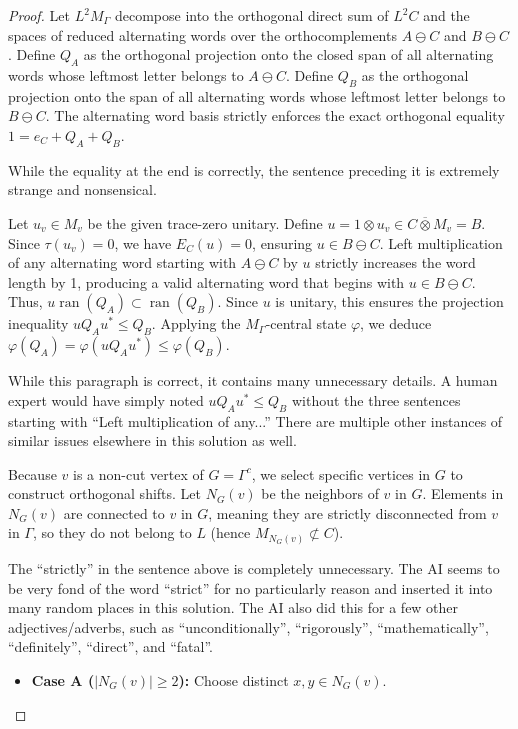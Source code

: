 \documentclass[12pt]{article}
\newcommand{\review}[1]{\begin{reviewbox}#1\end{reviewbox}}
\begin{document}
\begin{proof}
Let $L^2M_\Gamma$ decompose into the orthogonal direct sum of $L^2C$ and the spaces of reduced alternating words over the orthocomplements $A \ominus C$ and $B \ominus C$. Define $Q_A$ as the orthogonal projection onto the closed span of all alternating words whose leftmost letter belongs to $A \ominus C$. Define $Q_B$ as the orthogonal projection onto the span of all alternating words whose leftmost letter belongs to $B \ominus C$. The alternating word basis strictly enforces the exact orthogonal equality $1 = e_C + Q_A + Q_B$.

\review{While the equality at the end is correctly, the sentence preceding it is extremely strange and nonsensical.}

Let $u_v \in M_v$ be the given trace-zero unitary. Define $u = 1 \otimes u_v \in C \overline{\otimes} M_v = B$. Since $\tau(u_v)=0$, we have $E_C(u)=0$, ensuring $u \in B \ominus C$. Left multiplication of any alternating word starting with $A \ominus C$ by $u$ strictly increases the word length by 1, producing a valid alternating word that begins with $u \in B \ominus C$. Thus, $u \operatorname{ran}(Q_A) \subset \operatorname{ran}(Q_B)$. Since $u$ is unitary, this ensures the projection inequality $u Q_A u^* \le Q_B$. Applying the $M_\Gamma$-central state $\varphi$, we deduce $\varphi(Q_A) = \varphi(u Q_A u^*) \le \varphi(Q_B)$.

\review{While this paragraph is correct, it contains many unnecessary details. A human expert would have simply noted $uQ_Au^\ast \leq Q_B$ without the three sentences starting with ``Left multiplication of any...'' There are multiple other instances of similar issues elsewhere in this solution as well.}

Because $v$ is a non-cut vertex of $G = \Gamma^c$, we select specific vertices in $G$ to construct orthogonal shifts. Let $N_{G}(v)$ be the neighbors of $v$ in $G$. Elements in $N_G(v)$ are connected to $v$ in $G$, meaning they are strictly disconnected from $v$ in $\Gamma$, so they do not belong to $L$ (hence $M_{N_G(v)} \not\subset C$). 

\review{The ``strictly'' in the sentence above is completely unnecessary. The AI seems to be very fond of the word ``strict'' for no particularly reason and inserted it into many random places in this solution. The AI also did this for a few other adjectives/adverbs, such as ``unconditionally'',    ``rigorously'', ``mathematically'', ``definitely'', ``direct'', and ``fatal''.}

\begin{itemize}
    \item \textbf{Case A ($|N_G(v)| \ge 2$):} Choose distinct $x, y \in N_G(v)$. 
    

\end{itemize}
\end{proof}
\end{document}
